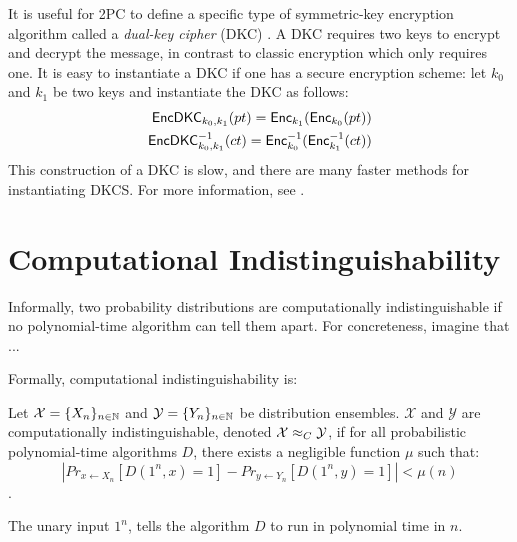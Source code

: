 It is useful for 2PC to define a specific type of symmetric-key encryption algorithm called a \textit{dual-key cipher} (DKC) \cite{bellare2012foundations}.
A DKC requires two keys to encrypt and decrypt the message, in contrast to classic encryption which only requires one.
It is easy to instantiate a DKC if one has a secure encryption scheme: let $k_0$ and $k_1$ be two keys and instantiate the DKC as follows:
\begin{equation}
    \begin{split}
        \textsf{EncDKC}_{k_0, k_1}(pt) = \textsf{Enc}_{k_1} ( \textsf{Enc}_{k_0} ( pt )) \\
        \textsf{EncDKC}^{-1}_{k_0, k_1}(ct) = \textsf{Enc}^{-1}_{k_0} ( \textsf{Enc}^{-1}_{k_1} ( ct )) 
    \end{split}
\end{equation}
This construction of a DKC is slow, and there are many faster methods for instantiating DKCS.
For more information, see \cite{bellare2012foundations}.

\section{Computational Indistinguishability}

Informally, two probability distributions are computationally indistinguishable if no polynomial-time algorithm can tell them apart. 
For concreteness, imagine that ... 

Formally, computational indistinguishability is:

\begin{definition}
\label{defn:computational-indistinguishability}
Let $\mathcal{X} = \{X_n\}_{n \in \mathbb{N}}$ and $\mathcal{Y} = \{Y_n\}_{n \in \mathbb{N}}$ be distribution ensembles.
$\mathcal{X}$ and $\mathcal{Y}$ are computationally indistinguishable, denoted $\mathcal{X} \approx_C \mathcal{Y}$, if for all probabilistic polynomial-time algorithms $D$, there exists a negligible function $\mu$ such that:
\begin{equation}
    |Pr_{x \gets X_n} [D(1^n, x) = 1] - Pr_{y \gets Y_n} [D(1^n, y) = 1]| < \mu(n)
\end{equation}
\cite{katzlindelltextbook}.
\end{definition}

The unary input $1^n$, tells the algorithm $D$ to run in polynomial time in $n$.

